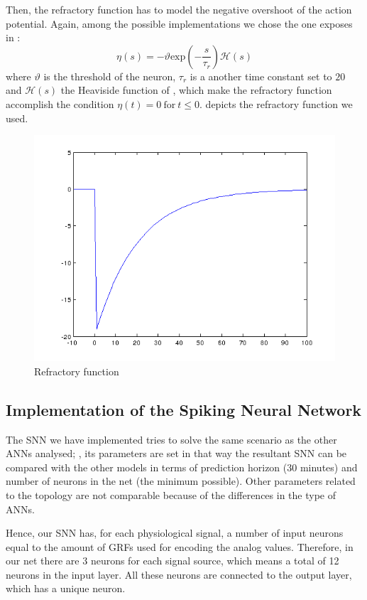 Then, the refractory function has to model the negative overshoot of the action potential. Again, among the possible implementations we chose the one exposes in 
\cite{booij2004temporal}:
\begin{equation}
\eta(s)=-\vartheta \text{exp}(-\frac{s}{\tau_{r}})\mathcal{H}(s)
\label{eq:refractoryfunction}
\end{equation}
where $\vartheta$ is the threshold of the neuron, $\tau_{r}$ is a another time constant set to $20$ and $\mathcal{H}(s)$ the Heaviside function of , which make the refractory function accomplish the condition $\eta(t)=0~\text{for}~t\leq 0$.  depicts the refractory function we used.
\begin{figure}[!ht]
\centering
\includegraphics[width=0.82\columnwidth]{images/results/refractoryfunction.png}
\caption{Refractory function}
\label{fig:refractoryfunctionPlot}
\end{figure}



\subsection{Implementation of the Spiking Neural Network}
\label{subsec:snnimplementation}
The SNN we have implemented tries to solve the same scenario as the other ANNs analysed; \ie, its parameters are set in that way the resultant SNN can be compared with the other models in terms of prediction horizon (30 minutes) and number of neurons in the net (the minimum possible). Other parameters related to the topology are not comparable because of the differences in the type of ANNs.

Hence, our SNN has, for each physiological signal, a number of input neurons equal to the amount of GRFs used for encoding the analog values. Therefore, in our net there are 3 neurons for each signal source, which means a total of 12 neurons in the input layer. All these neurons are connected to the output layer, which has a unique neuron.

